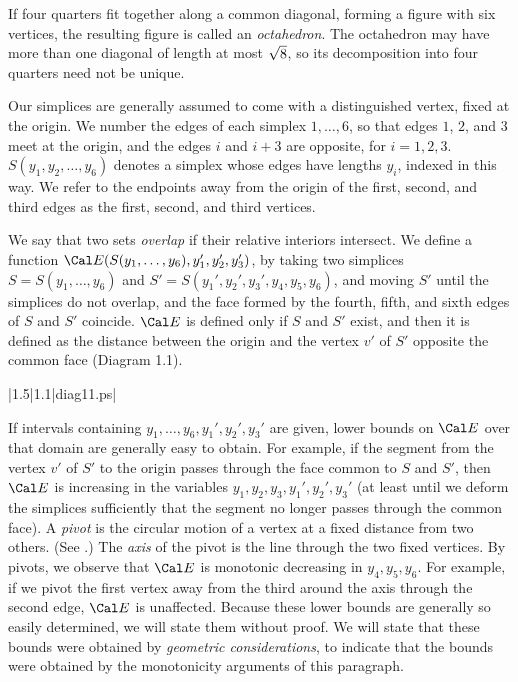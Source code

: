 If four quarters fit together along a common diagonal, forming a figure
with six vertices, the
resulting figure is called an {\it octahedron}.  
The 
octahedron may have more than one diagonal of length at most $\sqrt8$,
so its decomposition into four quarters need not be unique.

Our simplices are generally assumed to come with a distinguished
vertex, fixed  at the origin.  We 
number the edges of each simplex $1,\ldots,6$, so that
edges $1$, $2$, and $3$ meet at the origin, and
the edges $i$ and $i+3$ are opposite, for $i=1,2,3$.
$S(y_1,y_2,\ldots,y_6)$ denotes a simplex whose edges have
lengths $y_i$, indexed in this way.
We refer to the endpoints away from the origin
of the first, second, and third
edges as the first, second, and third
vertices.

We say that two sets {\it overlap\/} if their relative interiors intersect.
We define a function $\Cal E(S(y_1,\ldots,y_6),y_1',y_2',y_3')$, by taking
two simplices
$S=S(y_1,\ldots,y_6)$ and $S'=S(y_1',y_2',y_3',y_4,y_5,y_6)$,
 and moving $S'$ until the simplices do not overlap,
and the face formed by the fourth, fifth, and sixth edges of 
$S$ and $S'$ coincide.
$\Cal E$ is defined only if $S$ and $S'$ exist, and then it
is defined as the distance between
the origin and the vertex $v'$ of $S'$ opposite the common face
(Diagram 1.1).

\smallskip
\gram|1.5|1.1|diag11.ps|
\smallskip

If intervals containing $y_1,\ldots,y_6,y_1',y_2',y_3'$ are given,
 lower
bounds on $\Cal E$ over that domain are generally easy to obtain.  
For example, 
if the segment from the vertex $v'$ of $S'$ to the origin passes
through the face common to $S$ and $S'$, then
$\Cal E$ is 
increasing in the variables $y_1,y_2,y_3,y_1',y_2',y_3'$ (at least until we
deform the simplices sufficiently that the segment no longer
passes through the common face).  A {\it pivot\/} is the circular motion
of a vertex at a fixed distance from two others.  (See \cite{I}.)
The {\it axis\/} of the pivot is the line through the two fixed vertices.
By pivots,
we observe that $\Cal E$ is monotonic
decreasing in $y_4,y_5,y_6$.
For example, if we pivot the first vertex away from the third
around the axis through the second edge, $\Cal E$ is unaffected.
Because these lower bounds are generally so easily determined,
we will state them without proof.  We will state that these
bounds were obtained by {\it geometric considerations}, to
indicate that the bounds were obtained by the monotonicity arguments
of this paragraph.



